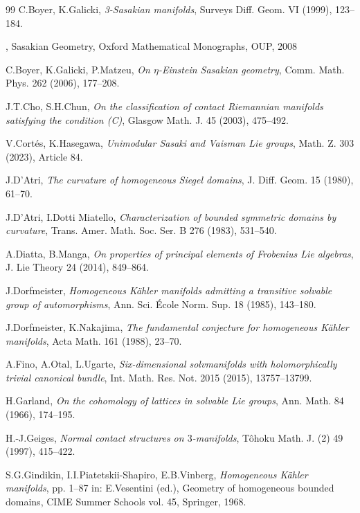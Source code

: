 \documentclass[12pt, twoside]{amsart}
\theoremstyle{definition}
\begin{document}
\begin{thebibliography}{99}
  C.Boyer, K.Galicki, \textit{3-Sasakian manifolds}, Surveys Diff. Geom. VI (1999), 123--184.

 \bysame, Sasakian Geometry, Oxford Mathematical Monographs, OUP, 2008

C.Boyer, K.Galicki, P.Matzeu, \textit{On $\eta$-Einstein Sasakian geometry}, Comm. Math. Phys. 262 (2006), 177--208.

J.T.Cho, S.H.Chun, \textit{On the classification of contact Riemannian manifolds satisfying the condition (C)}, Glasgow Math. J. 45 (2003), 475--492.

V.Cort\'es, K.Hasegawa, \textit{Unimodular Sasaki and Vaisman Lie groups}, Math. Z. 303 (2023), Article 84.

J.D'Atri, \textit{The curvature of homogeneous Siegel domains}, J. Diff. Geom. 15 (1980), 61--70. 

J.D'Atri, I.Dotti Miatello, \textit{Characterization of bounded symmetric domains by curvature}, Trans. Amer. Math. Soc. Ser. B 276 (1983), 531--540.

A.Diatta, B.Manga, \textit{On properties of principal elements of Frobenius Lie algebras}, J. Lie Theory 24 (2014), 849--864.

J.Dorfmeister, \textit{Homogeneous K{\"a}hler manifolds admitting a transitive solvable group of automorphisms}, Ann. Sci. {\'Ecole} Norm. Sup. 18 (1985), 143--180.

 J.Dorfmeister, K.Nakajima, \textit{The fundamental conjecture for homogeneous K{\"a}hler manifolds}, Acta Math. 161 (1988), 23--70.

A.Fino, A.Otal, L.Ugarte, \textit{Six-dimensional solvmanifolds with holomorphically trivial canonical bundle}, Int. Math. Res. Not. 2015 (2015), 13757--13799.

 H.Garland, \textit{On the cohomology of lattices in solvable Lie groups}, Ann. Math. 84 (1966), 174--195.

H.-J.Geiges, \textit{Normal contact structures on $3$-manifolds}, T{\^o}hoku Math. J. (2) 49 (1997), 415--422.

S.G.Gindikin, I.I.Piatetskii-Shapiro, E.B.Vinberg, \textit{Homogeneous K{\"a}hler manifolds}, pp. 1--87 in: E.Vesentini (ed.), Geometry of homogeneous bounded domains, CIME Summer Schools vol. 45, Springer, 1968.


\end{thebibliography}
\end{document}
